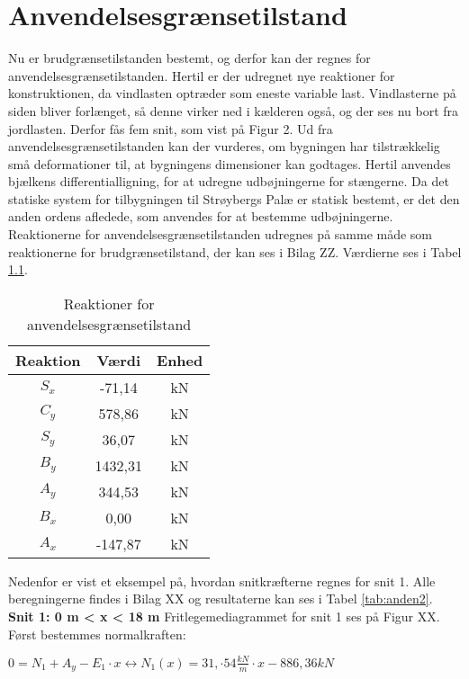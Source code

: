 \chapter{Anvendelsesgrænsetilstand}
Nu er brudgrænsetilstanden bestemt, og derfor kan der regnes for anvendelsesgrænsetilstanden. Hertil er der udregnet nye reaktioner for konstruktionen, da vindlasten optræder som eneste variable last. Vindlasterne på siden bliver forlænget, så denne virker ned i kælderen også, og der ses nu bort fra jordlasten. Derfor fås fem snit, som vist på Figur 2. Ud fra anvendelsesgrænsetilstanden kan der vurderes, om bygningen har tilstrækkelig små deformationer til, at bygningens dimensioner kan godtages. Hertil anvendes bjælkens differentialligning, for at udregne udbøjningerne for stængerne. Da det statiske system for tilbygningen til Strøybergs Palæ er statisk bestemt, er det den anden ordens afledede, som anvendes for at bestemme udbøjningerne. Reaktionerne for anvendelsesgrænsetilstanden udregnes på samme måde som reaktionerne for brudgrænsetilstand, der kan ses i Bilag ZZ. Værdierne ses i Tabel \ref{tab:anden}.
\begin{table}
	\begin{center}
		\begin{tabular}{|c|c|c|}
			\hline
			Reaktion & Værdi & Enhed \\ \hline
			$S_x$ & -71,14 		& kN      \\ \hline
			$C_y$ & 578,86 		& kN      \\ \hline
			$S_y$ & 36,07 		& kN       \\ \hline
			$B_y$ & 1432,31 	& kN      \\ \hline
			$A_y$ & 344,53 		& kN      \\ \hline
			$B_x$ & 0,00 		& kN      \\ \hline
			$A_x$ & -147,87 	& kN       \\ \hline
		\end{tabular}
		\caption{Reaktioner for anvendelsesgrænsetilstand}
		\label{tab:anden}
	\end{center}
\end{table}

Nedenfor er vist et eksempel på, hvordan snitkræfterne regnes for snit 1. Alle beregningerne findes i Bilag XX og resultaterne kan ses i Tabel \ref{tab:anden2}.
\newline
\newline
\textbf{Snit 1: 0 m < x < 18 m}
\newline
Fritlegemediagrammet for snit 1 ses på Figur XX.
\newline
\newline
Først bestemmes normalkraften:
\begin{center}
	$0 = N_1 + A_y - E_1\cdot x \leftrightarrow N_1(x) = 31,\cdot54 \frac{kN}{m} \cdot x - 886,\!36 kN$
\end{center}

